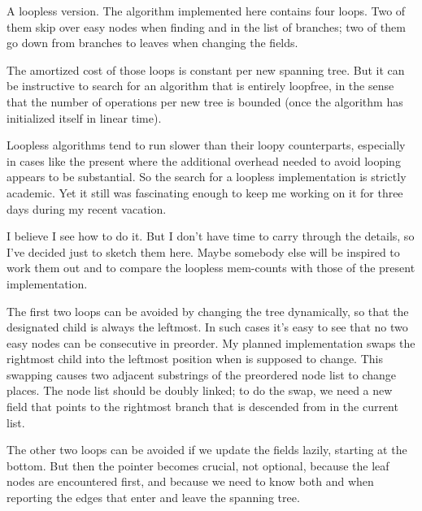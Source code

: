 A loopless version. The algorithm implemented here contains four
loops. Two of them skip over easy nodes when finding  and 
in the list of branches; two of them go down from branches to leaves
when changing the  fields.

The amortized cost of those loops is constant per new spanning tree.
But it can be instructive to search for an algorithm that is entirely
loopfree, in the sense that the number of operations per new tree
is bounded (once the algorithm has initialized itself in linear time).

Loopless algorithms tend to run slower than their loopy counterparts,
especially in cases like the present where the additional overhead
needed to avoid looping appears to be substantial. So the search
for a loopless implementation is strictly academic. Yet it still
was fascinating enough to keep me working on it for three days
during my recent vacation.

I believe I see how to do it. But I don't have time to carry through
the details, so I've decided just to sketch them here. Maybe somebody
else will be inspired to work them out and to compare the
loopless mem-counts with those of the present implementation.

The first two loops can be avoided by changing the tree dynamically,
so that the designated child is always the leftmost. In such cases
it's easy to see that no two easy nodes can be consecutive in preorder.
My planned implementation swaps the rightmost child into the leftmost
position when  is supposed to change. This swapping causes
two
adjacent substrings of the preordered node list to change places.
The node list should be doubly linked;
to do the swap, we need a new field  that points to the
rightmost branch that is descended from  in the current list.

The other two loops can be avoided if we update the  fields lazily,
starting at the bottom.  But then the pointer  becomes
crucial, not optional, because the leaf nodes are encountered first,
and because we need to know both  and  when
reporting the edges that enter and leave the spanning tree.

